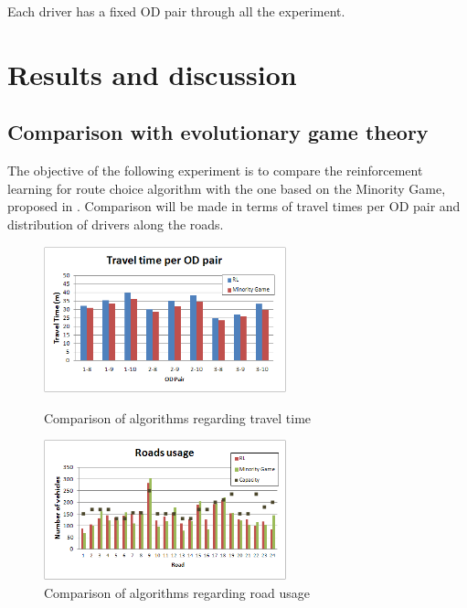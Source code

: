\documentclass[12pt]{llncs}
\begin{document}
Each driver has a fixed OD pair through all the experiment.%

\section{Results and discussion}
\label{sec:results}


\subsection{Comparison with evolutionary game theory}

The objective of the following experiment is to compare the reinforcement learning for route choice algorithm with the one based on the Minority Game, proposed in \cite{Galib&Moser2011}. Comparison will be made in terms of travel times per OD pair and distribution of drivers along the roads. 

\begin{figure}[ht]
    \centerline{\includegraphics[width=7cm]{img/rl_vs_mg_traveltime.png}}
    \caption{Comparison of algorithms regarding travel time}
    \label{fig:travelTimeComparison}
\vspace*{3ex} \centering
    \centerline{\includegraphics[width=7cm]{img/roadsUsage_comparison.png}}
    \caption{Comparison of algorithms regarding road usage}
    \label{fig:roadsUsageComparison}
\end{figure}
\end{document}
